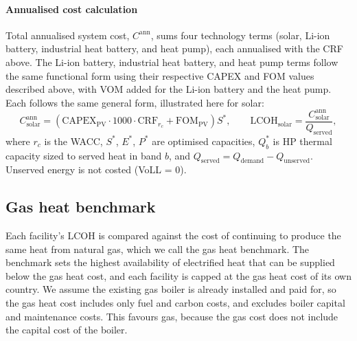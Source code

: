 \documentclass[11pt]{article}
\newcommand{\PV}{\mathrm{PV}}
\begin{document}
\paragraph*{Annualised cost calculation}
Total annualised system cost, $C^{\mathrm{ann}}$, sums four technology terms (solar, Li-ion battery, industrial heat battery, and heat pump), each annualised with the CRF above. The Li-ion battery, industrial heat battery, and heat pump terms follow the same functional form using their respective CAPEX and FOM values described above, with VOM added for the Li-ion battery and the heat pump. Each follows the same general form, illustrated here for solar:
\begin{equation}
C^{\mathrm{ann}}_{\mathrm{solar}} = \left(\mathrm{CAPEX}_{\PV}\cdot 1000 \cdot \mathrm{CRF}_{r_c} + \mathrm{FOM}_{\PV}\right) S^{*}, \qquad
\mathrm{LCOH}_{\mathrm{solar}} = \frac{C^{\mathrm{ann}}_{\mathrm{solar}}}{Q_{\mathrm{served}}},
\end{equation}
where $r_c$ is the WACC, $S^*$, $E^*$, $P^*$ are optimised capacities, $Q_b^*$ is HP thermal capacity sized to served heat in band $b$, and $Q_{\mathrm{served}}=Q_{\mathrm{demand}}-Q_{\mathrm{unserved}}$. Unserved energy is not costed (VoLL = 0).

\subsection*{Gas heat benchmark}
Each facility's LCOH is compared against the cost of continuing to produce the same heat from natural gas, which we call the gas heat benchmark. The benchmark sets the highest availability of electrified heat that can be supplied below the gas heat cost, and each facility is capped at the gas heat cost of its own country. We assume the existing gas boiler is already installed and paid for, so the gas heat cost includes only fuel and carbon costs, and excludes boiler capital and maintenance costs. This favours gas, because the gas cost does not include the capital cost of the boiler.
\end{document}
